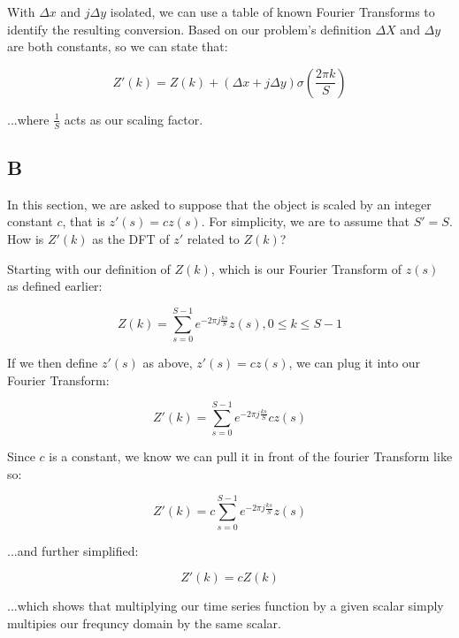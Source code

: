 \documentclass{article}
\begin{document}
\noindent With $\Delta x$ and $j \Delta y$ isolated, we can use a table of known Fourier Transforms to identify the resulting conversion. Based on our problem's definition $\Delta X$ and $\Delta y$ are both constants, so we can state that:

\begin{equation}
    Z'(k) = Z(k) + (\Delta x + j \Delta y) \sigma(\frac{2 \pi k}{S})
\end{equation}

\noindent ...where $\frac{1}{S}$ acts as our scaling factor.

\subsection*{B}

In this section, we are asked to suppose that the object is scaled by an integer constant $c$, that is $z'(s)=cz(s)$. For simplicity, we are to assume that $S'=S$. How is $Z'(k)$ as the DFT of $z'$ related to $Z(k)$?

\noindent Starting with our definition of $Z(k)$, which is our Fourier Transform of $z(s)$ as defined earlier:

\begin{equation}
    Z(k) = \sum^{S-1}_{s=0} e^{-2\pi j \frac{ks}{S}} z(s), 0\leq k \leq S-1
\end{equation}

\noindent If we then define $z'(s)$ as above, $z'(s)=cz(s)$, we can plug it into our Fourier Transform:

\begin{equation}
    Z'(k) = \sum^{S-1}_{s=0} e^{-2\pi j \frac{ks}{S}} cz(s)
\end{equation}

\noindent Since $c$ is a constant, we know we can pull it in front of the fourier Transform like so:

\begin{equation}
    Z'(k) = c \sum^{S-1}_{s=0} e^{-2\pi j \frac{ks}{S}} z(s) 
\end{equation}

\noindent ...and further simplified:

\begin{equation}
    Z'(k) = c Z(k)
\end{equation}

\noindent ...which shows that multiplying our time series function by a given scalar simply multipies our frequncy domain by the same scalar.
\end{document}

